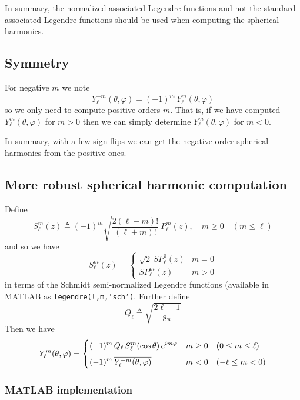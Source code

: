 \documentclass[a4paper,10pt]{article}
\newcommand{\dfn}{\triangleq}
\begin{document}
In summary, the normalized associated Legendre functions and not the standard associated Legendre functions should be used when computing the spherical harmonics.

\subsection{Symmetry}

For negative $m$ we note
\[
	Y_{\ell}^{-m}(\theta,\varphi)=(-1)^{m}\,\overline{Y_{\ell}^{m}(\theta,\varphi)}
\]
so we only need to compute positive orders $m$.  That is, if we have computed $Y_{\ell}^{m}(\theta,\varphi)$ for $m>0$ then we can simply determine $Y_{\ell}^{m}(\theta,\varphi)$ for $m<0$.

In summary, with a few sign flips we can get the negative order spherical harmonics from the positive ones.

\subsection{More robust spherical harmonic computation}

Define
\[
	S_{\ell}^{m}(z)\dfn(-1)^{m}\sqrt{\frac{2(\ell-m)!}{(\ell+m)!}}\,
		P_{\ell}^{m}(z),\quad m\geq0\quad (m\leq\ell)
\]
and so we have
\begin{equation}
\label{eqn:sps}
	S_{\ell}^{m}(z)=
		\begin{cases}
			\sqrt{2}\,S\!P_{\ell}^{0}(z) &m=0 \\[2mm]
			S\!P_{\ell}^{m}(z) &m>0
		\end{cases}
\end{equation}
in terms of the Schmidt semi-normalized Legendre functions (available in MATLAB as {\tt\color{blue}legendre(l,m,'sch')}. Further define
\[
	Q_{\ell}\dfn\sqrt{\frac{2\ell+1}{8\pi}}
\]
Then we have
\[
	Y_{\ell}^{m}(\theta,\varphi)=
		\begin{cases}
			\displaystyle
			(-1)^{m}\,Q_{\ell}\,
			S_{\ell}^{m}(\cos\theta)\,e^{im\varphi} &m\geq0\quad (0\leq m\leq\ell) \\[2mm]
			\displaystyle
			(-1)^{m}\,\overline{Y_{\ell}^{\smash{-m}}(\theta,\varphi)} &m<0\quad (-\ell\leq m<0)
		\end{cases}
\]

\subsubsection{MATLAB implementation}
\end{document}
